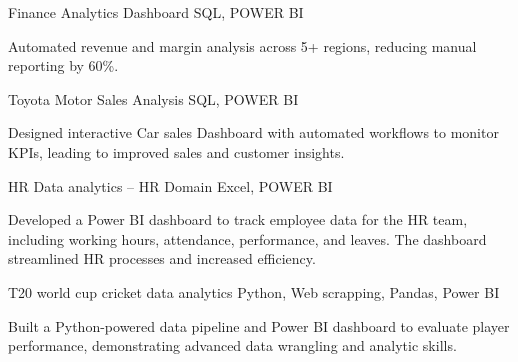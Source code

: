 {}
{Finance Analytics Dashboard}
{SQL, POWER BI}
{\jbegin
    \item{Automated revenue and margin analysis across 5+ regions, reducing 
manual reporting by 60\%. }
\jend}


{}
{Toyota Motor Sales Analysis}
{SQL, POWER BI}
{\jbegin
    \item{Designed interactive Car sales Dashboard with automated workflows to 
monitor KPIs, leading to improved sales and customer insights. }
\jend}
{}
{HR Data analytics – HR Domain}
{Excel, POWER BI}
{\jbegin
    \item{Developed a Power BI dashboard to track employee data for the HR team, 
including working hours, attendance, performance, and leaves. The 
dashboard streamlined HR processes and increased efficiency.  }
\jend}
{}
{T20 world cup cricket data analytics}
{Python, Web scrapping, Pandas, Power BI }
{\jbegin
    \item{Built a Python-powered data pipeline and Power BI dashboard to evaluate 
player performance, demonstrating advanced data wrangling and analytic 
skills.  }
\jend}








